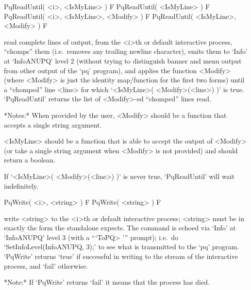 \>PqReadUntil( <i>, <IsMyLine> ) F
\>PqReadUntil( <IsMyLine> ) F
\>PqReadUntil( <i>, <IsMyLine>, <Modify> ) F
\>PqReadUntil( <IsMyLine>, <Modify> ) F

read complete lines  of  {\ANUPQ}  output,  from  the  <i>th  or  default
interactive {\ANUPQ} process, ``chomps'' them (i.e.~removes any  trailing
newline character), emits them to `Info' at `InfoANUPQ' level 2  (without
trying to distinguish banner and menu output from  other  output  of  the
`pq' program), and applies the function <Modify> (where <Modify>  is  just
the identity map/function for the first two forms)  until  a  ``chomped''
line  <line>  for  which  `<IsMyLine>(  <Modify>(<line>)  )'   is   true.
`PqReadUntil' returns the list of <Modify>-ed ``chomped'' lines read.

*Notes:* 
When provided by the user, <Modify> should be a function that  accepts  a
single string argument.

<IsMyLine> should be a function that is able  to  accept  the  output  of
<Modify> (or take a single string argument when <Modify> is not provided)
and should return a boolean.

If `<IsMyLine>( <Modify>(<line>) )' is  never  true,  `PqReadUntil'  will
wait indefinitely.

\>PqWrite( <i>, <string> ) F
\>PqWrite( <string> ) F

write <string> to the <i>th  or  default  interactive  {\ANUPQ}  process;
<string> must be in exactly the form the {\ANUPQ} standalone expects. The
command is echoed via `Info' at `InfoANUPQ' level 3 (with a  ```ToPQ> '''
prompt); i.e.~do `SetInfoLevel(InfoANUPQ, 3);' to see what is transmitted
to the `pq' program. `PqWrite' returns `true' if successful in writing  to
the stream of the interactive {\ANUPQ} process, and `fail' otherwise.

*Note:*
If `PqWrite' returns `fail' it means that the {\ANUPQ} process has died.

